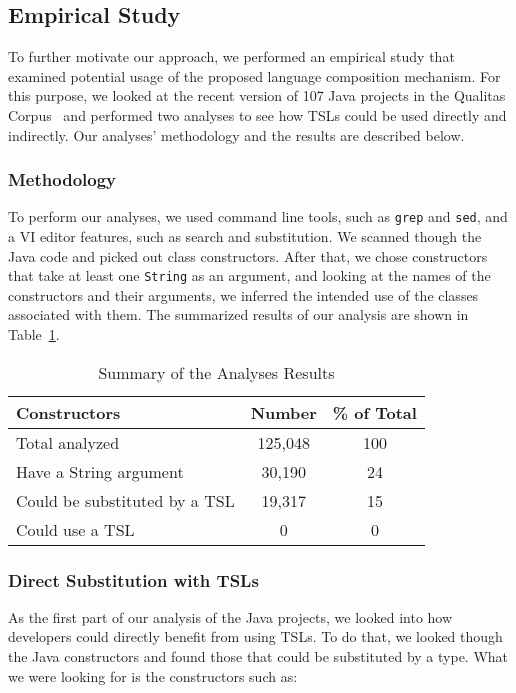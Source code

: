 \subsection{Empirical Study}

To further motivate our approach, we performed an empirical study that examined potential usage of the proposed language composition mechanism. For this purpose, we looked at the recent version of 107 Java projects in the Qualitas Corpus~\cite{QualitasCorpus:APSEC:2010} and performed two analyses to see how TSLs could be used directly and indirectly. Our analyses' methodology and the results are described below.

\subsubsection{Methodology}

To perform our analyses, we used command line tools, such as \lstinline{grep} and \lstinline{sed}, and a VI editor features, such as search and substitution. We scanned though the Java code and picked out class constructors. After that, we chose constructors that take at least one \lstinline{String} as an argument, and looking at the names of the constructors and their arguments, we inferred the intended use of the classes associated with them. The summarized results of our analysis are shown in Table~\ref{t-summary}.

\begin{table}
   \centering
    \begin{tabular}{l | c | c}
    \bf Constructors & \bf Number & \bf \% of Total \\ \hline
    Total analyzed & 125,048 & 100 \\
    Have a String argument & 30,190 & 24 \\
    Could be substituted by a TSL & 19,317 & 15 \\
    Could use a TSL & 0 & 0 \\
    \end{tabular}
    \vspace{0.15in}
    \caption{Summary of the Analyses Results}
    \label{t-summary}
\end{table}

\subsubsection{Direct Substitution with TSLs}

As the first part of our analysis of the Java projects, we looked into how developers could directly benefit  from using TSLs. To do that, we looked though the Java constructors and found those that could be substituted by a type. What we were looking for is the constructors such as:

